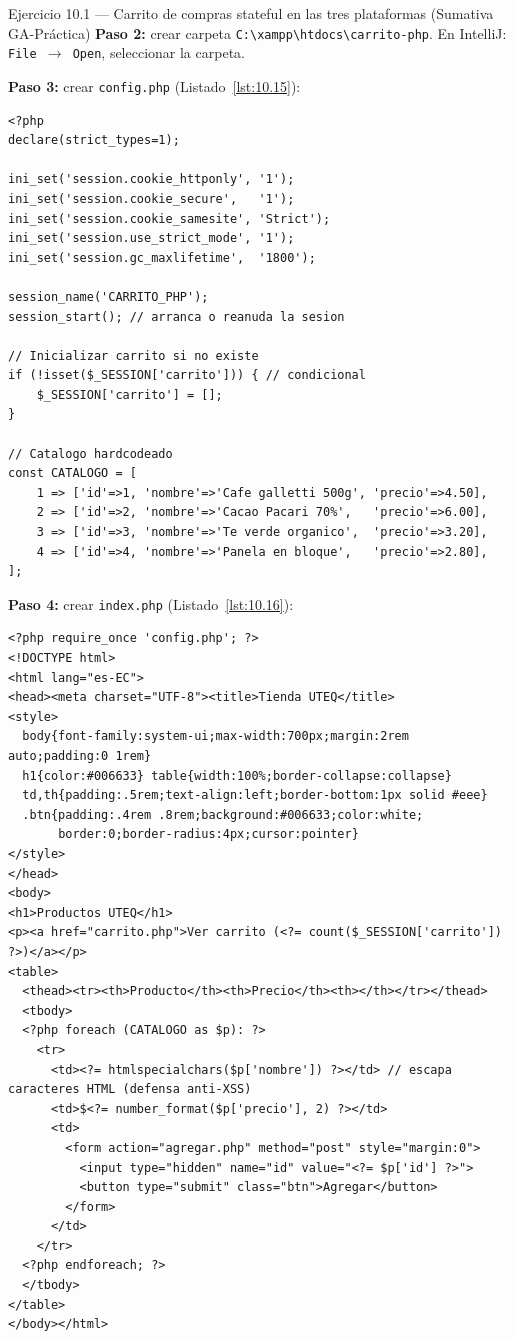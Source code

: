 \begin{cajaejercicio}{Ejercicio 10.1 --- Carrito de compras stateful en las tres plataformas (Sumativa GA-Práctica)}
\textbf{Paso 2:} crear carpeta \texttt{C:\textbackslash{}xampp\textbackslash{}htdocs\textbackslash{}carrito-php}.
En IntelliJ: \texttt{File $\rightarrow$ Open}, seleccionar la carpeta.

\textbf{Paso 3:} crear \texttt{config.php} (Listado~\ref{lst:10.15}):

\begin{lstlisting}[style=php,caption={config.php},label=lst:10.15]
<?php
declare(strict_types=1);

ini_set('session.cookie_httponly', '1');
ini_set('session.cookie_secure',   '1');
ini_set('session.cookie_samesite', 'Strict');
ini_set('session.use_strict_mode', '1');
ini_set('session.gc_maxlifetime',  '1800');

session_name('CARRITO_PHP');
session_start(); // arranca o reanuda la sesion

// Inicializar carrito si no existe
if (!isset($_SESSION['carrito'])) { // condicional
    $_SESSION['carrito'] = [];
}

// Catalogo hardcodeado
const CATALOGO = [
    1 => ['id'=>1, 'nombre'=>'Cafe galletti 500g', 'precio'=>4.50],
    2 => ['id'=>2, 'nombre'=>'Cacao Pacari 70%',   'precio'=>6.00],
    3 => ['id'=>3, 'nombre'=>'Te verde organico',  'precio'=>3.20],
    4 => ['id'=>4, 'nombre'=>'Panela en bloque',   'precio'=>2.80],
];
\end{lstlisting}

\textbf{Paso 4:} crear \texttt{index.php} (Listado~\ref{lst:10.16}):

\begin{lstlisting}[style=php,caption={index.php},label=lst:10.16]
<?php require_once 'config.php'; ?>
<!DOCTYPE html>
<html lang="es-EC">
<head><meta charset="UTF-8"><title>Tienda UTEQ</title>
<style>
  body{font-family:system-ui;max-width:700px;margin:2rem auto;padding:0 1rem}
  h1{color:#006633} table{width:100%;border-collapse:collapse}
  td,th{padding:.5rem;text-align:left;border-bottom:1px solid #eee}
  .btn{padding:.4rem .8rem;background:#006633;color:white;
       border:0;border-radius:4px;cursor:pointer}
</style>
</head>
<body>
<h1>Productos UTEQ</h1>
<p><a href="carrito.php">Ver carrito (<?= count($_SESSION['carrito']) ?>)</a></p>
<table>
  <thead><tr><th>Producto</th><th>Precio</th><th></th></tr></thead>
  <tbody>
  <?php foreach (CATALOGO as $p): ?>
    <tr>
      <td><?= htmlspecialchars($p['nombre']) ?></td> // escapa caracteres HTML (defensa anti-XSS)
      <td>$<?= number_format($p['precio'], 2) ?></td>
      <td>
        <form action="agregar.php" method="post" style="margin:0">
          <input type="hidden" name="id" value="<?= $p['id'] ?>">
          <button type="submit" class="btn">Agregar</button>
        </form>
      </td>
    </tr>
  <?php endforeach; ?>
  </tbody>
</table>
</body></html>
\end{lstlisting}


\end{cajaejercicio}

